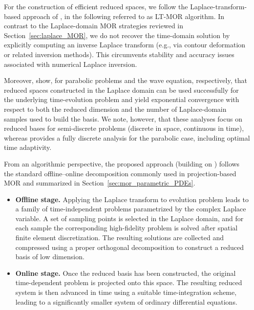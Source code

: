 For the construction of efficient reduced spaces, we follow the Laplace-transform-based approach
of \cite{henriquez2024fast,HenriquezHesthaven2024}, in the following referred to as LT-MOR algorithm. 
In contrast to the Laplace-domain MOR strategies
reviewed in Section~\ref{sec:laplace_MOR}, we do not recover the time-domain solution by explicitly
computing an inverse Laplace transform (e.g., via contour deformation or related inversion
methods). This circumvents stability and accuracy issues associated with numerical Laplace
inversion.

Moreover, \cite{henriquez2024fast,HenriquezHesthaven2024} show, for parabolic problems and the wave
equation, respectively, that reduced spaces constructed in the Laplace domain can be used
successfully for the underlying time-evolution problem and yield exponential convergence with
respect to both the reduced dimension and the number of Laplace-domain samples used to build the
basis. We note, however, that these analyses focus on reduced bases for semi-discrete problems
(discrete in space, continuous in time), whereas \cite{feischl2025optimal} provides a fully discrete
analysis for the parabolic case, including optimal time adaptivity.

From an algorithmic perspective, the proposed approach (building on
\cite{henriquez2024fast,HenriquezHesthaven2024,feischl2025optimal}) follows the standard
offline--online decomposition commonly used in projection-based MOR and summarized in
Section~\ref{sec:mor_parametric_PDEs}.

\begin{itemize}
    \item[(i)]
    {\bf Offline stage.}
    Applying the Laplace transform to evolution problem leads to a family
    of time-independent problems parametrized by the complex Laplace variable.
    A set of sampling points is selected in the Laplace domain, and for each
    sample the corresponding high-fidelity problem is solved after spatial
    finite element discretization.
    The resulting solutions are collected and compressed using a proper
    orthogonal decomposition to construct a reduced basis of low dimension.

    \item[(ii)]
    {\bf Online stage.}
    Once the reduced basis has been constructed, the original time-dependent
    problem is projected onto this space.
    The resulting reduced system is then advanced in time using a suitable
    time-integration scheme, leading to a significantly smaller system of
    ordinary differential equations. 
\end{itemize}

